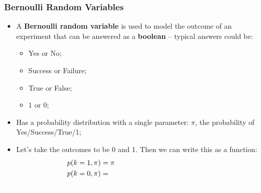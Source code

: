 \documentclass[aspectratio=169]{beamer}
\theoremstyle{principle}
\begin{document}
\begin{frame}
\frametitle{Bernoulli Random Variables}

\begin{itemize}
\item A \textbf{Bernoulli random variable} is used to model the outcome of an experiment that can be answered as a \textbf{boolean} -- typical answers could be:
\begin{itemize}
\item  Yes or No;
\item Success or Failure;
\item True or False;
\item $1$ or $0$;
\end{itemize}
\bigskip

\item Has a probability distribution with a single parameter: $\pi$, the probability of Yes/Success/True/1;
\bigskip

\item Let's take the outcomes to be 0 and 1.  Then we can write this as a function:
\begin{align*}
p(k = 1,\pi) &= \pi\\
p(k = 0,\pi) &= \color{white}1 - \pi\\
\color{white}p(k,\pi) &\color{white}= \pi^k(1-\pi)^{1-k} \mbox{ for }k = 0\mbox{ or }k = 1.
\end{align*}

\end{itemize}

\end{frame}
\end{document}
